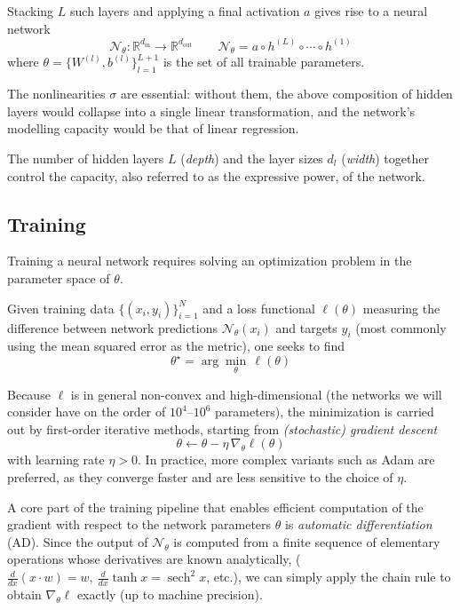 Stacking $L$ such layers and applying a final activation $a$ gives rise to a neural network
$$
\mathcal{N}_\theta : \mathbb{R}^{d_{\mathrm{in}}} \to \mathbb{R}^{d_{\mathrm{out}}}
\qquad
\mathcal{N}_\theta = a \circ h^{(L)} \circ \cdots \circ h^{(1)}
$$
where $\theta = \{W^{(l)}, b^{(l)}\}_{l=1}^{L+1}$ is the set of all trainable parameters.

The nonlinearities $\sigma$ are essential: without them, the above composition of hidden layers would collapse into a single linear transformation,
and the network's modelling capacity would be that of linear regression.

The number of hidden layers $L$ (\emph{depth}) and the layer sizes $d_l$ (\emph{width}) together control the capacity,
also referred to as the expressive power, of the network.




\subsection{Training}

Training a neural network requires solving an optimization problem in the parameter space of $\theta$.

Given training data $\{(x_i, y_i)\}_{i=1}^N$ and a loss functional $\ell(\theta)$ measuring the difference between network predictions $\mathcal{N}_\theta(x_i)$
and targets $y_i$ (most commonly using the mean squared error as the metric), one seeks to find
$$
\theta^{\star} = \arg\min_{\theta}\, \ell(\theta)
$$

Because $\ell$ is in general non-convex and high-dimensional (the networks we will consider have on the order of $10^4$--$10^6$ parameters),
the minimization is carried out by first-order iterative methods, starting from \emph{(stochastic) gradient descent}
$$
\theta \leftarrow \theta - \eta\, \nabla_\theta \ell(\theta)
$$
with learning rate $\eta > 0$. In practice, more complex variants such as Adam \cite{king_adam} are preferred, as they converge faster and are less sensitive to the choice of $\eta$.

A core part of the training pipeline that enables efficient computation of the gradient with respect to the network parameters $\theta$ is \emph{automatic differentiation} (AD).
Since the output of $\mathcal{N}_\theta$ is computed from a finite sequence of elementary operations whose derivatives are known analytically, ($\frac{d}{dx}(x\cdot w) = w, \:\frac{d}{dx}\tanh{x} = \operatorname{sech}^2 x$, etc.),
we can simply apply the chain rule to obtain $\nabla_\theta \ell$ exactly (up to machine precision).

